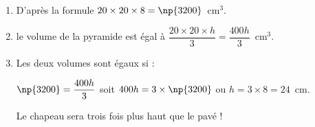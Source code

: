 
\bigskip 

% 
%
%
% 
%
%

\begin{enumerate}
\item %
D'après la formule $20 \times 20 \times 8 = \np{3200}$~cm$^3$. 
\item %
le volume de la pyramide est égal à $\dfrac{20 \times 20 \times h}{3} = \dfrac{400h}{3}$~cm$^3$. 
\item %
Les deux volumes sont égaux si :

$\np{3200} =  \dfrac{400h}{3}$ soit $400h = 3 \times \np{3200}$ ou $h = 3 \times 8 = 24$~cm.

Le chapeau sera trois fois plus haut que le pavé !
\end{enumerate} 

\bigskip 

